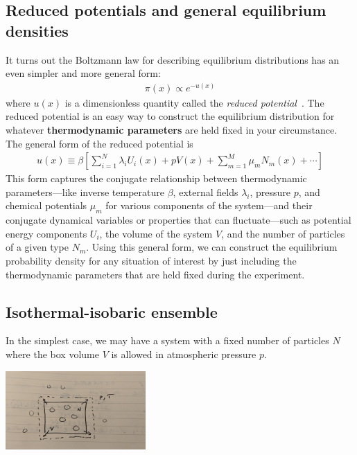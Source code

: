 \documentclass[english,course]{lecture}
\begin{document}
\subsection{Reduced potentials and general equilibrium densities}

It turns out the Boltzmann law for describing equilibrium distributions has an even simpler and more general form:
\begin{eqnarray}
\pi(x) \propto e^{-u(x)}
\end{eqnarray}
where $u(x)$ is a dimensionless quantity called the \emph{reduced potential}~\cite{shirts2008statistically}.
The reduced potential is an easy way to construct the equilibrium distribution for whatever {\bf thermodynamic parameters} are held fixed in your circumstance.
The general form of the reduced potential is
\begin{eqnarray}
u(x) \equiv \beta \left[ \sum_{i=1}^N \lambda_i U_i(x) + p V(x) + \sum_{m=1}^M \mu_m N_m(x) + \cdots \right]
\end{eqnarray}
This form captures the conjugate relationship between thermodynamic parameters---like inverse temperature $\beta$, external fields $\lambda_i$, pressure $p$, and chemical potentials $\mu_m$ for various components of the system---and their conjugate dynamical variables or properties that can fluctuate---such as potential energy components $U_i$, the volume of the system $V$, and the number of particles of a given type $N_m$.
Using this general form, we can construct the equilibrium probability density for any situation of interest by just including the thermodynamic parameters that are held fixed during the experiment.

\subsection{Isothermal-isobaric ensemble}

In the simplest case, we may have a system with a fixed number of particles $N$ where the box volume $V$ is allowed in atmospheric pressure $p$.

\begin{centering}
\includegraphics[width=0.4\textwidth]{figures/npt-system.jpg}

\end{centering}
\end{document}
